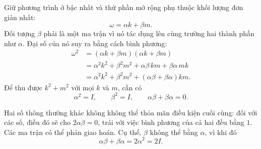 \begin{classroomqa}
\end{classroomqa}

\begin{classroomqa}
\end{classroomqa}

Giữ phương trình ở bậc nhất và thử phần mở rộng phụ thuộc khối lượng đơn giản nhất:
\begin{equation}
\omega=\alpha k+\beta m.
\end{equation}
Đối tượng \(\beta\) phải là một ma trận vì nó tác dụng lên cùng trường hai thành phần như \(\alpha\). Đại số của nó suy ra bằng cách bình phương:
\begin{align}
\omega^2
&=(\alpha k+\beta m)(\alpha k+\beta m)\\
&=\alpha^2k^2+\beta^2m^2
+\alpha\beta\,km+\beta\alpha\,mk\\
&=\alpha^2k^2+\beta^2m^2
+(\alpha\beta+\beta\alpha)km.
\end{align}
Để thu được \(k^2+m^2\) với mọi \(k\) và \(m\), cần có
\begin{equation}
\alpha^2=I,
\qquad
\beta^2=I,
\qquad
\alpha\beta+\beta\alpha=0.
\end{equation}

Hai số thông thường khác không không thể thỏa mãn điều kiện cuối cùng: đối với các số, điều đó sẽ cho \(2\alpha\beta=0\), trái với việc bình phương của cả hai đều bằng \(1\). Các ma trận có thể phản giao hoán. Cụ thể, \(\beta\) không thể bằng \(\alpha\), vì khi đó
\begin{equation}
\alpha\beta+\beta\alpha=2\alpha^2=2I.
\end{equation}

